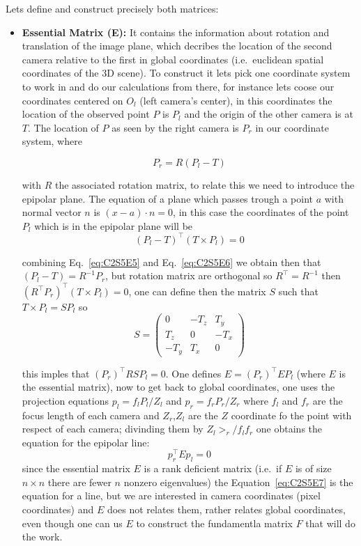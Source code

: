 Lets define and construct precisely both matrices:
\begin{itemize}
\item \textbf{Essential Matrix (E):} It contains the information about rotation and translation of the image plane, which decribes the location of the second camera relative to the first in global coordinates (i.e.\ euclidean spatial coordinates of the 3D scene). To construct it lets pick one coordinate system to work in and do our calculations from there, for instance lets coose our coordinates centered on $O_l$ (left camera's center), in this coordinates the location of the observed point $P$ is $P_l$ and the origin of the other camera is at $T$. The location of $P$ as seen by the right camera is $P_r$ in our coordinate system, where 

\begin{equation}
\label{eq:C2S5E5}
P_r=R(P_l-T)
\end{equation}

with $R$ the associated rotation matrix, to relate this we need to introduce the epipolar plane. The equation of a plane which passes trough a point $a$ with normal vector $n$ is $(x-a)\cdot n=0$, in this case the coordinates of the point $P_l$ which is in the epipolar plane will be 
\begin{equation}
\label{eq:C2S5E6}
(P_l-T)^{\intercal}(T\times P_l)=0
\end{equation}

combining Eq.~\ref{eq:C2S5E5} and Eq.~\ref{eq:C2S5E6} we obtain then that $(P_l-T)=R^{-1}P_r$, but rotation matrix are orthogonal so $R^{\intercal}=R^{-1}$ then $(R^{\intercal}P_r)^{\intercal}(T\times P_l)=0$, one can define then the matrix $S$ such that $T\times P_l=SP_l$ so 
$$
S=
\left(\begin{matrix}
0 & -T_z & T_y \\
T_z & 0 & -T_x \\
-T_y & T_x & 0
\end{matrix}\right)
$$

this imples that $(P_r)^{\intercal}RSP_l=0$. One defines $E=(P_r)^{\intercal}EP_l$ (where $E$ is the essential matrix), now to get back to global coordinates, one uses the projection equations $p_l=f_lP_l/Z_l$ and $p_r=f_rP_r/Z_r$ where $f_l$ and $f_r$ are the focus length of each camera and $Z_r$,$Z_l$ are the $Z$ coordinate fo the point with respect of each camera; divinding them by $Z_l>_r/f_lf_r$ one obtains the equation for the epipolar line:
\begin{equation}
\label{eq:C2S5E7}
p_r^{\intercal}Ep_l=0
\end{equation}
since the essential matrix $E$ is a rank deficient matrix (i.e.\ if $E$ is of size $n\times n$ there are fewer $n$ nonzero eigenvalues) the Equation~\ref{eq:C2S5E7} is the equation for a line, but we are interested in camera coordinates (pixel coordinates) and $E$ does not relates them, rather relates global coordinates, even though one can us $E$ to construct the fundamentla matrix $F$ that will do the work.


\end{itemize}
